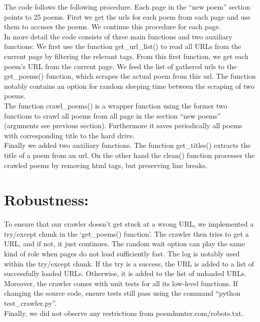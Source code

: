 \documentclass[11pt]{article}
\begin{document}
The code follows the following procedure. Each page in the “new poem” section points to 25 poems. First we get the urls for each poem from each page and use them to accuses the poems. We continue this procedure for each page.\\
In more detail the code consists of three main functions and two auxiliary functions:
We first use the function get\_url\_list() to read all URLs from the current page by filtering the relevant tags. From this first function, we get each poem's URL from the current page. 
We feed the list of gathered urls to the get\_poems() function, which scrapes the actual poem from this url. The function notably contains an option for random sleeping time between the scraping of two poems.\\
The function crawl\_poems() is a wrapper function using the former two functions to crawl all poems from all page in the section “new poems” (arguments see previous section). Furthermore it saves periodically all poems with corresponding title to the hard drive. \\
Finally we added two auxiliary functions. The function get\_titles() extracts the title of a poem from an url. On the other hand the clean() function processes the crawled poems by removing html tags, but preserving line breaks.

\section*{Robustness:}

To ensure that our crawler doesn't get stuck at a wrong URL, we implemented a try/except chunk in the ‘get\_poems() function’. The crawler then tries to get a URL, and if not, it just continues. The random wait option can play the same kind of role when pages do not load sufficiently fast.
The log is notably used within the try/except chunk. If the try is a success, the URL is added to a list of successfully loaded URLs. Otherwise, it is added to the list of unloaded URLs.\\
Moreover, the crawler comes with unit tests for all its low-level functions. If changing the source code, ensure tests still pass using the command “python test\_crawler.py”.\\
Finally, we did not observe any restrictions from poemhunter.com/robots.txt.
\end{document}
